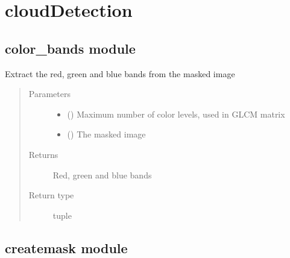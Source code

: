 \documentclass[letterpaper,10pt,english]{sphinxmanual}
\begin{document}
\chapter{cloudDetection}
\label{\detokenize{modules::doc}}\label{\detokenize{modules:clouddetection}}

\section{color\_bands module}
\label{\detokenize{color_bands:module-color_bands}}\label{\detokenize{color_bands:color-bands-module}}\label{\detokenize{color_bands::doc}}

\begin{fulllineitems}
\label{\detokenize{color_bands:color_bands.extract}}
Extract the red, green and blue bands from the masked image
\begin{quote}\begin{description}
\item[{Parameters}] \leavevmode\begin{itemize}
\item {} 
 () \textendash{} Maximum number of color levels, used in GLCM matrix

\item {} 
 () \textendash{} The masked image

\end{itemize}

\item[{Returns}] \leavevmode
Red, green and blue bands

\item[{Return type}] \leavevmode
tuple

\end{description}\end{quote}

\end{fulllineitems}



\section{createmask module}
\label{\detokenize{createmask:module-createmask}}\label{\detokenize{createmask::doc}}\label{\detokenize{createmask:createmask-module}}
\end{document}
